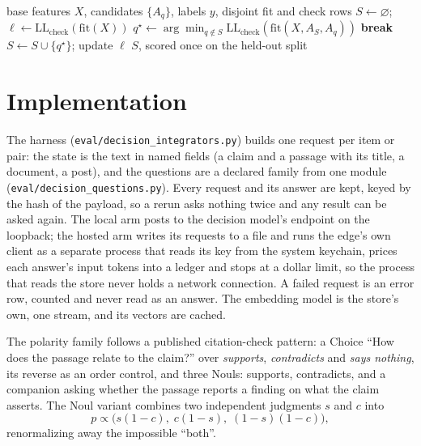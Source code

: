 \documentclass[11pt]{article}
\theoremstyle{definition}
\theoremstyle{plain}
\theoremstyle{remark}
\newcommand{\code}[1]{\texttt{#1}}
\begin{document}
\begin{algorithm}[t]
\caption{One pass of question discovery (greedy forward selection).}\label{alg:select}
\begin{algorithmic}[1]
\Require base features $X$, candidates $\{A_q\}$, labels $y$, disjoint fit and check rows
\State $S \gets \varnothing$; $\ell \gets \mathrm{LL}_{\mathrm{check}}(\mathrm{fit}(X))$
  \State $q^\star \gets \arg\min_{q \notin S} \mathrm{LL}_{\mathrm{check}}(\mathrm{fit}(X, A_S, A_q))$
   \State \textbf{break} \EndIf
  \State $S \gets S \cup \{q^\star\}$; update $\ell$
\EndWhile
\State \Return $S$, scored once on the held-out split
\end{algorithmic}
\end{algorithm}

\section{Implementation}
The harness (\code{eval/decision\_integrators.py}) builds one request per item or pair: the
state is the text in named fields (a claim and a passage with its title, a document, a post), and
the questions are a declared family from one module (\code{eval/decision\_questions.py}). Every
request and its answer are kept, keyed by the hash of the payload, so a rerun asks nothing twice
and any result can be asked again. The local arm posts to the decision model's endpoint on the
loopback; the hosted arm writes its requests to a file and runs the edge's own client as a
separate process that reads its key from the system keychain, prices each answer's input tokens
into a ledger and stops at a dollar limit, so the process that reads the store never holds a
network connection. A failed request is an error row, counted and never read as an answer. The
embedding model is the store's own, one stream, and its vectors are cached.

The polarity family follows a published citation-check pattern: a Choice ``How does the passage
relate to the claim?'' over \emph{supports}, \emph{contradicts} and \emph{says nothing}, its
reverse as an order control, and three Nouls: supports, contradicts, and a companion asking whether
the passage reports a finding on what the claim asserts. The Noul variant combines two
independent judgments $s$ and $c$ into
\begin{equation}
p \propto \bigl(s(1-c),\; c(1-s),\; (1-s)(1-c)\bigr),
\end{equation}
renormalizing away the impossible ``both''.
\end{document}
